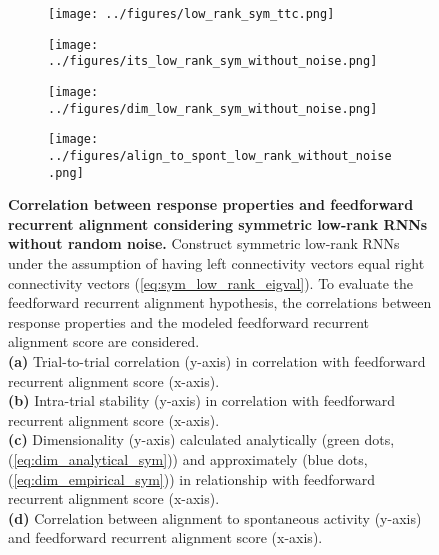 \documentclass[11pt]{article}
\begin{document}
%	
		\begin{figure}[H]
			\centering
			\begin{subfigure}[b]{0.45\textwidth}
				\texttt{[image: ../figures/low\_rank\_sym\_ttc.png]}
				\caption{}
			\end{subfigure}
			\begin{subfigure}[b]{0.45\textwidth}
				\texttt{[image: ../figures/its\_low\_rank\_sym\_without\_noise.png]}
				\caption{}
			\end{subfigure}
			\newline
			\begin{subfigure}[b]{0.45\textwidth}
				\texttt{[image: ../figures/dim\_low\_rank\_sym\_without\_noise.png]}
				\caption{}
			\end{subfigure}
			\begin{subfigure}[b]{0.45\textwidth}
				\texttt{[image: ../figures/align\_to\_spont\_low\_rank\_without\_noise.png]}
				\caption{}
			\end{subfigure}
			\caption{\textbf{Correlation between response properties and feedforward recurrent alignment considering symmetric low-rank RNNs without random noise.} Construct symmetric low-rank RNNs under the assumption of having left connectivity vectors equal right connectivity vectors (\ref{eq:sym_low_rank_eigval}). To evaluate the feedforward recurrent alignment hypothesis, the correlations between response properties and the modeled feedforward recurrent alignment score are considered. \\
			\textbf{(a)} Trial-to-trial correlation (y-axis) in correlation with feedforward recurrent alignment score (x-axis).\\
			\textbf{(b)} Intra-trial stability (y-axis) in correlation with feedforward recurrent alignment score (x-axis).\\
			\textbf{(c)} Dimensionality (y-axis) calculated analytically (green dots, (\ref{eq:dim_analytical_sym})) and approximately (blue dots, (\ref{eq:dim_empirical_sym})) in relationship with feedforward recurrent alignment score (x-axis).\\
			\textbf{(d)} Correlation between alignment to spontaneous activity (y-axis) and feedforward recurrent alignment score (x-axis).}
		

\end{figure}
\end{document}
